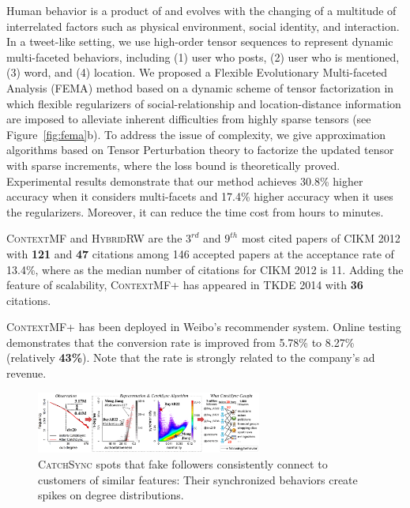 \documentclass[10.5pt]{article}
\begin{document}
 Human behavior is a product of and evolves with the changing of a multitude of interrelated factors such as physical environment, social identity, and interaction. In a tweet-like setting, we use high-order tensor sequences to represent dynamic multi-faceted behaviors, including (1) user who posts, (2) user who is mentioned, (3) word, and (4) location. We proposed a Flexible Evolutionary Multi-faceted Analysis (\textsc{FEMA}) method \cite{jiang2014fema} based on a dynamic scheme of tensor factorization in which flexible regularizers of social-relationship and location-distance information are imposed to alleviate inherent difficulties from highly sparse tensors (see Figure~\ref{fig:fema}b). To address the issue of complexity, we give approximation algorithms based on Tensor Perturbation theory to factorize the updated tensor with sparse increments, where the loss bound is theoretically proved. Experimental results demonstrate that our method achieves 30.8\% higher accuracy when it considers multi-facets and 17.4\% higher accuracy when it uses the regularizers. Moreover, it can reduce the time cost from hours to minutes.

\begin{compactitem}
\item \textsc{ContextMF} \cite{jiang2012socialcontextual} and \textsc{HybridRW} \cite{jiang2012socialrecommendation} are the $3^{rd}$ and $9^{th}$ most cited papers of CIKM 2012 with \textbf{121} and \textbf{47} citations among 146 accepted papers at the acceptance rate of 13.4\%, where as the median number of citations for CIKM 2012 is 11. Adding the feature of scalability, \textsc{ContextMF+} \cite{jiang2014scalable} has appeared in TKDE 2014 with \textbf{36} citations.
\item \textsc{ContextMF+} has been deployed in Weibo's recommender system. Online testing demonstrates that the conversion rate is improved from 5.78\% to 8.27\% (relatively \textbf{43\%}). Note that the rate is strongly related to the company's ad revenue.
\end{compactitem}

\vskip 0.03in


\begin{figure}
\vskip -0.12in
\includegraphics[width=0.66\textwidth]{figure/catchsync.pdf}
\vskip -0.18in
\caption{\textsc{CatchSync} \cite{jiang2014catchsync} spots that fake followers consistently connect to customers of similar features: Their synchronized behaviors create spikes on degree distributions.}
\label{fig:catchsync}
\vskip -0.12in
\end{figure}
\end{document}
